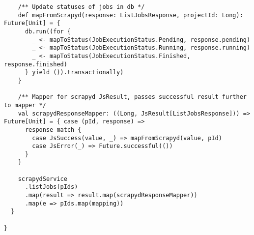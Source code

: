 \begin{lstlisting}
    /** Update statuses of jobs in db */
    def mapFromScrapyd(response: ListJobsResponse, projectId: Long): Future[Unit] = {
      db.run((for {
        _ <- mapToStatus(JobExecutionStatus.Pending, response.pending)
        _ <- mapToStatus(JobExecutionStatus.Running, response.running)
        _ <- mapToStatus(JobExecutionStatus.Finished, response.finished)
      } yield ()).transactionally)
    }

    /** Mapper for scrapyd JsResult, passes successful result further to mapper */
    val scrapydResponseMapper: ((Long, JsResult[ListJobsResponse])) => Future[Unit] = { case (pId, response) =>
      response match {
        case JsSuccess(value, _) => mapFromScrapyd(value, pId)
        case JsError(_) => Future.successful(())
      }
    }

    scrapydService
      .listJobs(pIds)
      .map(result => result.map(scrapydResponseMapper))
      .map(e => pIds.map(mapping))
  }

}
\end{lstlisting}
